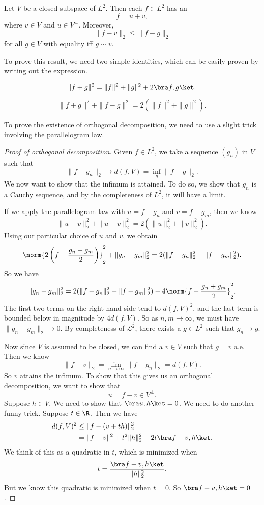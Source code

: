 \documentclass[a4paper]{article}
\begin{document}
\begin{thm}
  Let $V$ be a closed subspace of $L^2$. Then each $f \in L^2$ has an 
  \[
    f = u + v,
  \]
  where $v \in V$ and $u \in V^\perp$. Moreover,
  \[
    \|f - v\|_2 \leq \|f - g\|_2
  \]
  for all $g \in V$ with equality iff $g \sim v$.
\end{thm}

To prove this result, we need two simple identities, which can be easily proven by writing out the expression.
\begin{lemma}
  \[
    \|f + g\|^2 = \|f\|^2 + \|g\|^2 + 2 \bra f, g\ket.
  \]
\end{lemma}

\begin{lemma}
  \[
    \|f + g\|^2 + \|f - g\|^2 = 2(\|f\|^2 + \|g\|^2).
  \]
\end{lemma}

To prove the existence of orthogonal decomposition, we need to use a slight trick involving the parallelogram law.

\begin{proof}[Proof of orthogonal decomposition]
  Given $f \in L^2$, we take a sequence $(g_n)$ in $V$ such that
  \[
    \|f - g_n\|_2 \to d(f, V) = \inf_g \|f - g\|_2.
  \]
  We now want to show that the infimum is attained. To do so, we show that $g_n$ is a Cauchy sequence, and by the completeness of $L^2$, it will have a limit.

  If we apply the parallelogram law with $u = f - g_n$ and $v = f - g_m$, then we know
  \[
    \|u + v\|^2_2 + \|u - v\|_2^2 = 2(\|u\|^2_2 + \|v\|_2^2).
  \]
  Using our particular choice of $u$ and $v$, we obtain
  \[
    \norm{2 \left(f - \frac{g_n + g_m}{2}\right)}_2^2 + \|g_n - g_m\|_2^2 = 2(\|f - g_n\|_2^2 + \|f - g_m\|^2_2).
  \]
  So we have
  \[
    \|g_n - g_m\|_2^2 = 2(\|f - g_n\|_2^2 + \|f - g_m\|^2_2) - 4\norm{f - \frac{g_n + g_m}{2}}_2^2.
  \]
  The first two terms on the right hand side tend to $d(f, V)^2$, and the last term is bounded below in magnitude by $4d(f, V)$. So as $n, m \to \infty$, we must have $\|g_n - g_m\|_2 \to 0$. By completeness of $\mathcal{L}^2$, there exists a $g \in L^2$ such that $g_n \to g$.

  Now since $V$ is assumed to be closed, we can find a $v \in V$ such that $g = v$ a.e. Then we know
  \[
    \|f - v\|_2 = \lim_{n \to \infty}\|f - g_n\|_2 = d(f, V).
  \]
  So $v$ attains the infimum. To show that this gives us an orthogonal decomposition, we want to show that
  \[
    u = f - v \in V^\perp.
  \]
  Suppose $h \in V$. We need to show that $\bra u, h\ket = 0$. We need to do another funny trick. Suppose $t \in \R$. Then we have
  \begin{align*}
    d(f, V)^2 &\leq \|f - (v + th)\|_2^2 \\
    &= \|f - v\|^2 + t^2 \|h\|_2^2 - 2t \bra f - v, h\ket.
  \end{align*}
  We think of this as a quadratic in $t$, which is minimized when
  \[
    t = \frac{\bra f - v, h\ket}{\|h\|^2_2}.
  \]
  But we know this quadratic is minimized when $t = 0$. So $\bra f - v, h\ket = 0$.
\end{proof}
\end{document}
